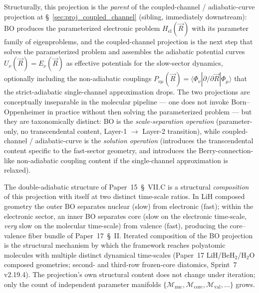 \documentclass[11pt]{article}
\begin{document}
Structurally, this projection is the \emph{parent} of the
coupled-channel / adiabatic-curve projection at
\S~\ref{sec:proj_coupled_channel} (sibling, immediately downstream):
BO produces the parameterized electronic problem $H_\text{el}(\vec{R})$
with its parameter family of eigenproblems, and the coupled-channel
projection is the next step that solves the parameterized problem
and assembles the adiabatic potential curves
$U_\nu(\vec{R}) = E_\nu(\vec{R})$ as effective potentials for the
slow-sector dynamics, optionally including the non-adiabatic
couplings $P_{\nu\mu}(\vec{R}) = \langle \Phi_\nu | \partial / \partial
\vec{R} | \Phi_\mu \rangle$ that the strict-adiabatic single-channel
approximation drops.  The two projections are conceptually
inseparable in the molecular pipeline --- one does not invoke
Born--Oppenheimer in practice without then solving the parameterized
problem --- but they are taxonomically distinct: BO is the
\emph{scale-separation operation} (parameter-only, no transcendental
content, Layer-1 $\to$ Layer-2 transition), while coupled-channel /
adiabatic-curve is the \emph{solution operation} (introduces the
transcendental content specific to the fast-sector geometry, and
introduces the Berry-connection-like non-adiabatic coupling content
if the single-channel approximation is relaxed).

The double-adiabatic structure of Paper~15~\S~VII.C is a structural
\emph{composition} of this projection with itself at two distinct
time-scale ratios.  In LiH composed geometry the outer BO separates
nuclear (slow) from electronic (fast); within the electronic sector,
an inner BO separates core (slow on the electronic time-scale,
\emph{very} slow on the molecular time-scale) from valence (fast),
producing the core--valence fiber bundle of Paper~17~\S~II.  Iterated
composition of the BO projection is the structural mechanism by
which the framework reaches polyatomic molecules with multiple
distinct dynamical time-scales (Paper~17 LiH/BeH$_2$/H$_2$O composed
geometries; second- and third-row frozen-core diatomics, Sprint~7
v2.19.4).  The projection's own structural content does not change
under iteration; only the count of independent parameter manifolds
$\{\mathcal{M}_\text{nuc}, \mathcal{M}_\text{core}, \mathcal{M}_\text{val},
\ldots\}$ grows.
\end{document}
